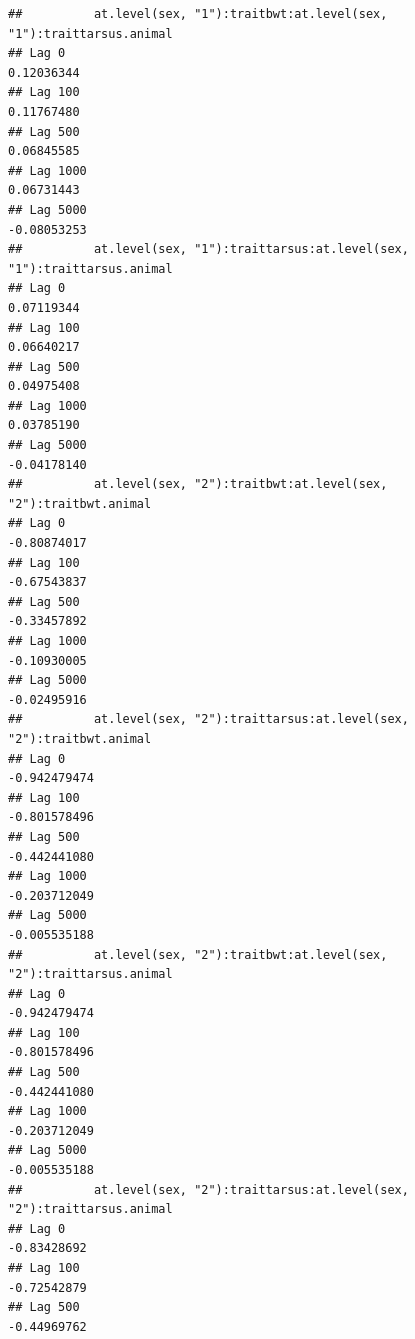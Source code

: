 \documentclass[
  12pt,
]{book}
\begin{document}
\begin{verbatim}
##          at.level(sex, "1"):traitbwt:at.level(sex, "1"):traittarsus.animal
## Lag 0                                                           0.12036344
## Lag 100                                                         0.11767480
## Lag 500                                                         0.06845585
## Lag 1000                                                        0.06731443
## Lag 5000                                                       -0.08053253
##          at.level(sex, "1"):traittarsus:at.level(sex, "1"):traittarsus.animal
## Lag 0                                                              0.07119344
## Lag 100                                                            0.06640217
## Lag 500                                                            0.04975408
## Lag 1000                                                           0.03785190
## Lag 5000                                                          -0.04178140
##          at.level(sex, "2"):traitbwt:at.level(sex, "2"):traitbwt.animal
## Lag 0                                                       -0.80874017
## Lag 100                                                     -0.67543837
## Lag 500                                                     -0.33457892
## Lag 1000                                                    -0.10930005
## Lag 5000                                                    -0.02495916
##          at.level(sex, "2"):traittarsus:at.level(sex, "2"):traitbwt.animal
## Lag 0                                                         -0.942479474
## Lag 100                                                       -0.801578496
## Lag 500                                                       -0.442441080
## Lag 1000                                                      -0.203712049
## Lag 5000                                                      -0.005535188
##          at.level(sex, "2"):traitbwt:at.level(sex, "2"):traittarsus.animal
## Lag 0                                                         -0.942479474
## Lag 100                                                       -0.801578496
## Lag 500                                                       -0.442441080
## Lag 1000                                                      -0.203712049
## Lag 5000                                                      -0.005535188
##          at.level(sex, "2"):traittarsus:at.level(sex, "2"):traittarsus.animal
## Lag 0                                                             -0.83428692
## Lag 100                                                           -0.72542879
## Lag 500                                                           -0.44969762

\end{verbatim}
\end{document}
